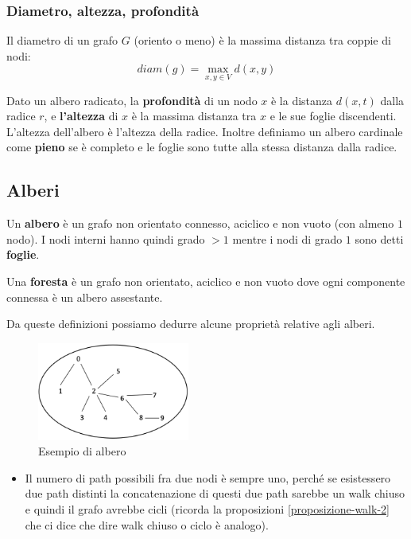 \subsubsection{Diametro, altezza, profondità}
\begin{definition}
    Il diametro di un grafo $G$ (oriento o meno) è la massima distanza tra coppie di nodi:
    \[diam(g) = \max_{x,y \in V}d(x,y)\]
\end{definition}

\begin{definition}
    Dato un albero radicato, la \textbf{profondità} di un nodo $x$ è la distanza $d(x,t)$ dalla radice $r$, e \textbf{l'altezza} di $x$ è la massima distanza tra $x$ e le sue foglie discendenti. L'altezza dell'albero è l'altezza della radice. Inoltre definiamo un albero cardinale come \textbf{pieno} se è completo e le foglie sono tutte alla stessa distanza dalla radice.
\end{definition}



\newpage
\subsection{Alberi}

\begin{definition}
    Un \textbf{albero} è un grafo non orientato connesso, aciclico e non vuoto (con almeno $1$ nodo).
    I nodi interni hanno quindi grado $>1$ mentre i nodi di grado $1$ sono detti \textbf{foglie}.
\end{definition}

\begin{definition}[Foresta]
    Una \textbf{foresta} è un grafo non orientato, aciclico e non vuoto dove ogni componente connessa è un albero assestante.
\end{definition}
\hspace{-15pt}Da queste definizioni possiamo dedurre alcune proprietà relative agli alberi.
\begin{figure}
    \centering
    \includegraphics[width=5cm]{images/es-albero.png}
    \vspace{-5pt}
    \caption{Esempio di albero}
\end{figure}
\begin{itemize}
    \item Il numero di path possibili fra due nodi è sempre uno, perché se esistessero due path distinti la concatenazione di questi due path sarebbe un walk chiuso e quindi il grafo avrebbe cicli (ricorda la proposizioni \ref{proposizione-walk-2} che ci dice che dire walk chiuso o ciclo è analogo).
\end{itemize}


